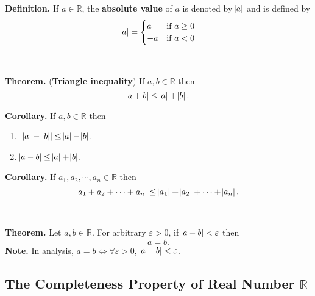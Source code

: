 \documentclass[12pt,a4paper]{article}
\begin{document}
\begin{tcolorbox}[colback=white]
	\textbf{Definition.} If $a\in\mathbb{R}$, the \textbf{absolute value} of $a$ is denoted by $\abs{a}$ and is defined by \[\abs{a}=\begin{cases}
		a &\text{if}\ a\geq0\\
		-a &\text{if}\ a<0
	\end{cases}
	\]
\end{tcolorbox}
\
\begin{tcolorbox}[colback=white]
	\textbf{Theorem.} (\textbf{Triangle inequality}) If $a,b\in\mathbb{R}$ then\[
	\abs{a+b}\leq\abs{a}+\abs{b}.
	\]
\end{tcolorbox}
\begin{tcolorbox}[colback=white]
	\textbf{Corollary.} If $a,b\in\mathbb{R}$ then \begin{enumerate}
		\item $||a|-|b||\leq\abs{a}-\abs{b}$.
		\item $\abs{a-b}\leq\abs{a}+\abs{b}$.
	\end{enumerate}
\end{tcolorbox}
\begin{tcolorbox}[colback=white]
	\textbf{Corollary.} If $a_1,a_2,\cdots,a_n\in\mathbb{R}$ then \[
	\abs{a_1+a_2+\cdots+a_n}\leq\abs{a_1}+\abs{a_2}+\cdots+\abs{a_n}.
	\]
\end{tcolorbox}
\
\begin{tcolorbox}[colback=white]
	\textbf{Theorem.} Let $a,b\in\mathbb{R}$. For arbitrary $\varepsilon>0$, if $\abs{a-b}<\varepsilon$ then \[
	a=b.
	\]\tcblower
	\textbf{Note.} In analysis, $a=b\iff\forall\varepsilon>0$, $\abs{a-b}<\varepsilon$.
\end{tcolorbox}

\newpage
\subsection{The Completeness Property of Real Number $\mathbb{R}$}
\end{document}
